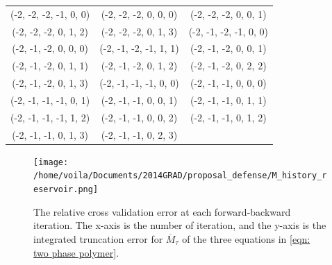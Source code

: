 \begin{center}\begin{tabular}{ccc}
(-2,  -2,  -2,    -1,     0,     0)&  
(-2,  -2,  -2,     0,     0,     0)&
(-2,  -2,  -2,     0,     0,     1)\\
(-2,  -2,  -2,     0,     1,     2)&
(-2,  -2,  -2,     0,     1,     3)&
(-2,  -1,  -2,    -1,     0,     0)\\
(-2,  -1,  -2,     0,     0,     0)&
(-2,  -1,  -2,    -1,     1,     1)&
(-2,  -1,  -2,     0,     0,     1)\\
(-2,  -1,  -2,     0,     1,     1)&
(-2,  -1,  -2,     0,     1,     2)&
(-2,  -1,  -2,     0,     2,     2)\\
(-2,  -1,  -2,     0,     1,     3)&
(-2,  -1,  -1,    -1,     0,     0)&
(-2,  -1,  -1,     0,     0,     0)\\
(-2,  -1,  -1,    -1,     0,     1)&
(-2,  -1,  -1,     0,     0,     1)&
(-2,  -1,  -1,     0,     1,     1)\\
(-2,  -1,  -1,    -1,     1,     2)&
(-2,  -1,  -1,     0,     0,     2)&
(-2,  -1,  -1,     0,     1,     2)\\
(-2,  -1,  -1,     0,     1,     3)&
(-2,  -1,  -1,     0,     2,     3)&
\end{tabular}
\label{tab: mob W}
\end{center}

\begin{figure}[htbp]
    \begin{center}
        \texttt{[image: /home/voila/Documents/2014GRAD/proposal\_defense/M\_history\_reservoir.png]}
        \caption{The relative cross validation error at each forward-backward iteration.
                 The x-axis is the number of iteration, and the y-axis
                 is the integrated truncation error
                 for  $\overline{M}_\tau$ of the three equations
                 in \eqref{eqn: two phase polymer}.}
        \label{fig: M history reservoir}
    \end{center}
\end{figure}


